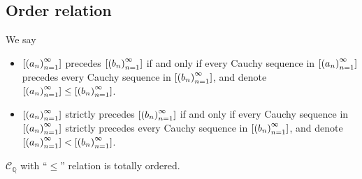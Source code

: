 \subsection{Order relation}

\begin{definition}
    We say
    \begin{itemize}
        \item $\class{\seq{a_{n}}}$ precedes $\class{\seq{b_{n}}}$ if and only if every Cauchy sequence in $\class{\seq{a_{n}}}$ precedes every Cauchy sequence in $\class{\seq{b_{n}}}$, and denote $\class{\seq{a_{n}}} \le \class{\seq{b_{n}}}$.
        \item $\class{\seq{a_{n}}}$ strictly precedes $\class{\seq{b_{n}}}$ if and only if every Cauchy sequence in $\class{\seq{a_{n}}}$ strictly precedes every Cauchy sequence in $\class{\seq{b_{n}}}$, and denote $\class{\seq{a_{n}}} < \class{\seq{b_{n}}}$.
    \end{itemize}
\end{definition}

\begin{theorem}
    $\mathscr{C}_{\mathbb{Q}}$ with ``$\le$'' relation is totally ordered.
\end{theorem}

